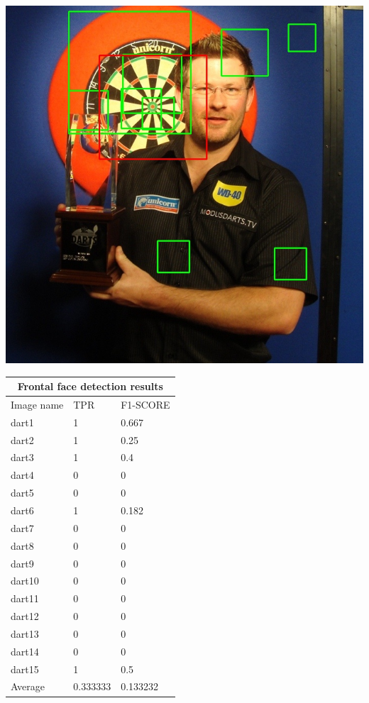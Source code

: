 \documentclass{article}
\begin{document}
\begin{multicols}{2}
\begin{multicols}{3}
    \includegraphics[width=\linewidth]{dart4-dart.jpg}\par
\end{multicols}
\label{fig:vjdartsimages}


\begin{center}
\begin{tabular}{ |p{2cm}||p{2cm}|p{2cm}| }
 \hline
 \multicolumn{3}{|c|}{Frontal face detection results} \\
 \hline
 Image name & TPR & F1-SCORE \\
 \hline
 dart1  & 1  & 0.667   \\
 dart2  & 1  & 0.25       \\
 dart3  & 1  & 0.4        \\
 dart4  & 0  & 0          \\
 dart5  & 0  & 0          \\
 dart6  & 1  & 0.182   \\
 dart7  & 0  & 0          \\
 dart8  & 0  & 0          \\
 dart9  & 0  & 0          \\
 dart10 & 0  & 0          \\
 dart11 & 0  & 0          \\
 dart12 & 0  & 0          \\
 dart13 & 0  & 0          \\
 dart14 & 0  & 0          \\
 dart15 & 1  & 0.5        \\
 \hline
 Average& 0.333333  & 0.133232    \\ 
 \hline
\end{tabular}
\label{tab:vjdartstable}
\end{center}


\end{multicols}
\end{document}
